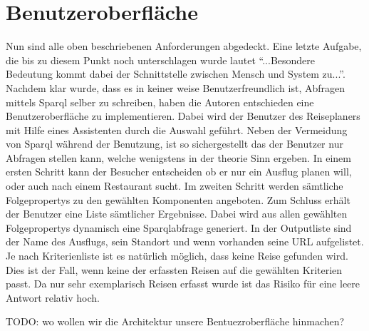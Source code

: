 \section{Benutzeroberfläche}
\label{sec:gui}

Nun sind alle oben beschriebenen Anforderungen abgedeckt. Eine letzte Aufgabe, die bis zu diesem Punkt noch unterschlagen wurde lautet "`...Besondere Bedeutung kommt dabei der Schnittstelle zwischen Mensch und System zu..."'. Nachdem klar wurde, dass es in keiner weise Benutzerfreundlich ist, Abfragen mittels Sparql selber zu schreiben, haben die Autoren entschieden eine Benutzeroberfläche zu implementieren. Dabei wird der Benutzer des Reiseplaners mit Hilfe eines Assistenten durch die Auswahl geführt. Neben der Vermeidung von Sparql während der Benutzung, ist so sichergestellt das der Benutzer nur Abfragen stellen kann, welche wenigstens in der theorie Sinn ergeben. 
In einem ersten Schritt kann der Besucher entscheiden ob er nur ein Ausflug planen will, oder auch nach einem Restaurant sucht. Im zweiten Schritt werden sämtliche Folgepropertys zu den gewählten Komponenten angeboten. Zum Schluss erhält der Benutzer eine Liste sämtlicher Ergebnisse. Dabei wird aus allen gewählten Folgepropertys dynamisch eine Sparqlabfrage generiert. In der Outputliste sind der Name des Ausflugs, sein Standort und wenn vorhanden seine URL aufgelistet. Je nach Kriterienliste ist es natürlich möglich, dass keine Reise gefunden wird. Dies ist der Fall, wenn keine der erfassten Reisen auf die gewählten Kriterien passt. Da nur sehr exemplarisch Reisen erfasst wurde ist das Risiko für eine leere Antwort relativ hoch.

TODO: wo wollen wir die Architektur unsere Bentuezroberfläche hinmachen?

